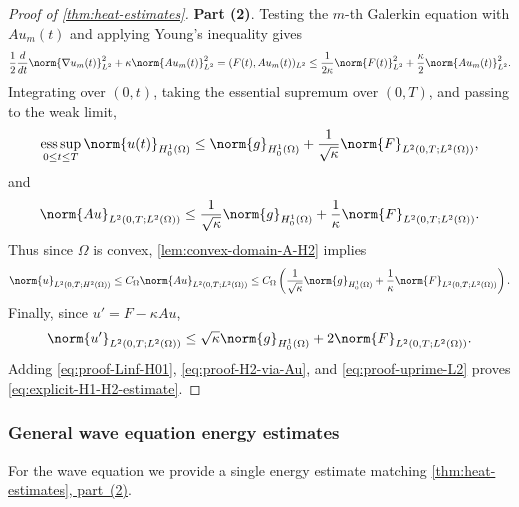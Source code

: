 \begin{proof}[Proof of \cref{thm:heat-estimates}]
\textbf{Part \textup{(2)}}.
Testing the $m$-th Galerkin equation with \(Au_m(t)\) and applying Young's
inequality gives
\begin{equation}\label{eq:proof-H1-Au-identity}
    \frac12\frac{d}{dt}\norm{\nabla u_m(t)}_{L^2}^2
    +
    \kappa\norm{Au_m(t)}_{L^2}^2
    =
    (F(t),Au_m(t))_{L^2}
    \le
    \frac1{2\kappa}\norm{F(t)}_{L^2}^2
    +
    \frac{\kappa}{2}\norm{Au_m(t)}_{L^2}^2.
\end{equation}
Integrating over \((0,t)\), taking the essential supremum over \((0,T)\), and
passing to the weak limit,
\begin{equation}\label{eq:proof-Linf-H01}
    \operatorname*{ess\,sup}_{0\le t\le T}\norm{u(t)}_{H_0^1(\Omega)}
    \le
    \norm{g}_{H_0^1(\Omega)}
    +
    \frac1{\sqrt{\kappa}}
    \norm{F}_{L^2(0,T;L^2(\Omega))},
\end{equation}
and
\begin{equation}\label{eq:proof-Au-L2}
    \norm{Au}_{L^2(0,T;L^2(\Omega))}
    \le
    \frac1{\sqrt{\kappa}}\norm{g}_{H_0^1(\Omega)}
    +
    \frac1{\kappa}
    \norm{F}_{L^2(0,T;L^2(\Omega))}.
\end{equation}
Thus since \(\Omega\) is convex, \cref{lem:convex-domain-A-H2} implies
\begin{equation}\label{eq:proof-H2-via-Au}
    \norm{u}_{L^2(0,T;H^2(\Omega))}
    \le
    C_\Omega\norm{Au}_{L^2(0,T;L^2(\Omega))}
    \le
    C_\Omega
    \left(
        \frac1{\sqrt{\kappa}}\norm{g}_{H_0^1(\Omega)}
        +
        \frac1{\kappa}
        \norm{F}_{L^2(0,T;L^2(\Omega))}
    \right).
\end{equation}
Finally, since \(u'=F-\kappa Au\),
\begin{equation}\label{eq:proof-uprime-L2}
    \norm{u'}_{L^2(0,T;L^2(\Omega))}
    \le
    \sqrt{\kappa}\norm{g}_{H_0^1(\Omega)}
    +
    2\norm{F}_{L^2(0,T;L^2(\Omega))}.
\end{equation}
Adding \eqref{eq:proof-Linf-H01}, \eqref{eq:proof-H2-via-Au}, and
\eqref{eq:proof-uprime-L2} proves \eqref{eq:explicit-H1-H2-estimate}.
\end{proof}

\subsubsection{General wave equation energy estimates}

For the wave equation we provide a single energy estimate matching
\hyperref[thm:heat-estimates-h1]{\cref*{thm:heat-estimates}, part~\textup{(2)}}.

